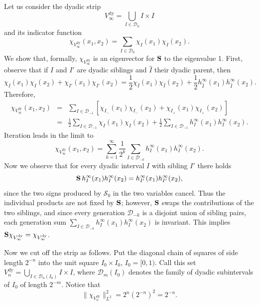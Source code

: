 \documentclass{article}
\newcommand{\tmop}[1]{\ensuremath{\operatorname{#1}}}
\def\S{{\bf S}}
\begin{document}
	Let us consider the dyadic strip
	\[ V_{\infty}^{\tmop{dy}} = \bigcup_{I \in \mathcal{D}_0} I \times I \]
	and its indicator function
	\[ \chi_{V_{\infty}^{\tmop{dy}}} (x_1, x_2) = \sum_{I \in \mathcal{D}_0}
	\chi_I (x_1) \chi_I (x_2) . \]
	We show that, formally, $\chi_{V_{\infty}^{\tmop{dy}}}$ is an eigenvector for
	$\S$ to the eigenvalue 1. First, observe that if $I$
	and $I'$ are dyadic siblings and $\hat{I}$ their dyadic parent, then
	\[ \chi_I (x_1) \chi_I (x_2) + \chi_{I'} (x_1) \chi_{I'} (x_2) = \frac{1}{2}
	\chi_{\hat{I}} (x_1) \chi_{\hat{I}} (x_2) + \frac{1}{2}
	h^{\infty}_{\hat{I}} (x_1) h^{\infty}_{\hat{I}} (x_2) . \]
	Therefore,
	\begin{eqnarray*}
		\chi_{V_{\infty}^{\tmop{dy}}} (x_1, x_2) & = & \sum_{I \in \mathcal{D}_{-
				1}} [\chi_{I_-} (x_1) \chi_{I_-} (x_2) + \chi_{I_+} (x_1) \chi_{I_+}
		(x_2)]\\
		& = & \frac{1}{2} \sum_{I \in \mathcal{D}_{- 1}} \chi_I (x_1) \chi_I (x_2)
		+ \frac{1}{2} \sum_{I \in \mathcal{D}_{- 1}} h^{\infty}_I (x_1) h^{\infty}_I
		(x_2) .
	\end{eqnarray*}
	Iteration leads in the limit to
	\[ \chi_{V_{\infty}^{\tmop{dy}}} (x_1, x_2) = \sum_{k = 1}^{\infty}
	\frac{1}{2^k} \sum_{I \in \mathcal{D}_{- k}} h^{\infty}_I (x_1)
	h^{\infty}_I (x_2) . \]
	Now we observe that for every dyadic interval $I$ with sibling $I'$ there holds
	\[ \S\, h^{\infty}_I (x_1) h^{\infty}_I (x_2) =
	h^{\infty}_{I'} (x_1) h^{\infty}_{I'} (x_2), \]
	since the two signs produced by $\mathcal S_0$ in the two variables cancel. Thus the individual products are not fixed by $\S$; however, $\S$ swaps the contributions of the two siblings, and since every generation $\mathcal D_{-k}$ is a disjoint union of sibling pairs, each generation sum $\sum_{I\in\mathcal D_{-k}} h^\infty_I(x_1)h^\infty_I(x_2)$ is invariant. This implies $\S \chi_{V_{\infty}^{\tmop{dy}}} =
	\chi_{V_{\infty}^{\tmop{dy}}}$.

	Now we cut off the strip as follows. Put the diagonal chain of squares of
	side length $2^{- n}$ into the unit square $I_0 \times I_0$, $I_0=[0,1)$. Call this set
	$V^{\tmop{dy}}_n = \bigcup_{I \in \mathcal{D}_n (I_0)} I \times I$, where $\mathcal D_m(I_0)$ denotes the family of dyadic subintervals of $I_0$ of length $2^{-m}$. Notice that
	\[ \| \chi_{V^{\tmop{dy}}_n} \|^2_{L^2} = 2^n (2^{- n})^2 = 2^{- n} . \]
\end{document}
